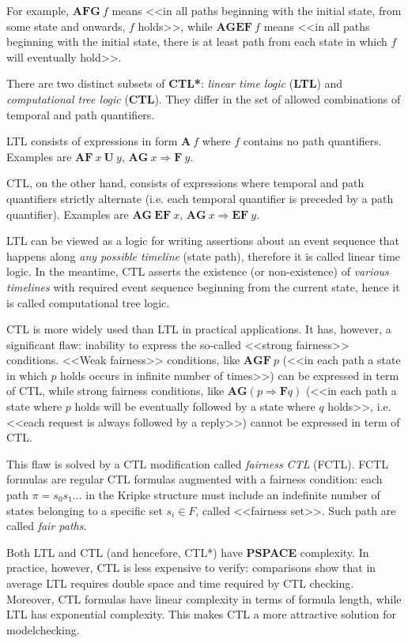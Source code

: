 \documentclass[a4paper,notitlepage,14pt]{article}
\begin{document}
For example, $\mathbf{AFG}~f$ means <<in all paths beginning with the initial state, from some state
and onwards, $f$ holds>>, while $\mathbf{AGEF}~f$ means <<in all paths beginning with the initial state,
there is at least path from each state in which $f$ will eventually hold>>.

There are two distinct subsets of \textbf{CTL*}: \emph{linear time logic} (\textbf{LTL}) and \emph{computational tree
  logic} (\textbf{CTL}). They differ in the set of allowed combinations of temporal and path
quantifiers.

LTL consists of expressions in form $\mathbf{A}~f$ where $f$ contains no path quantifiers. Examples are
$\mathbf{AF}~x~\mathbf{U}~y$, $\mathbf{AG}~x \Rightarrow \mathbf{F}~y$.

CTL, on the other hand, consists of expressions where temporal and path quantifiers
strictly alternate (i.e. each temporal quantifier is preceded by a path
quantifier). Examples are $\mathbf{AG}~\mathbf{EF}~x$, $\mathbf{AG}~x \Rightarrow \mathbf{EF}~y$.

LTL can be viewed as a logic for writing assertions about an event sequence that happens
along \emph{any possible timeline} (state path), therefore it is called linear time logic. In the
meantime, CTL asserts the existence (or non-existence) of \emph{various timelines} with required
event sequence beginning from the current state, hence it is called computational tree
logic.

CTL is more widely used than LTL in practical applications. It has, however, a significant
flaw: inability to express the so-called <<strong fairness>> conditions. <<Weak fairness>>
conditions, like $\mathbf{AGF}~p$ (<<in each path a state in which $p$ holds occurs in infinite number
of times>>) can be expressed in term of CTL, while strong fairness conditions, like $\mathbf{AG} (p \Rightarrow
\mathbf{F} q)$ (<<in each path a state where $p$ holds will be eventually followed by a
state where $q$ holds>>, i.e. <<each request is always followed by a reply>>) cannot be
expressed in term of CTL.

This flaw is solved by a CTL modification called \emph{fairness CTL} (FCTL). FCTL formulas
are regular CTL formulas augmented with a fairness condition: each path $\pi =
s_0s_1\ldots$ in the Kripke structure must include an indefinite number of states
belonging to a specific set $s_i \in F$, called <<fairness set>>. Such path are called
\emph{fair paths}.

Both LTL and CTL (and hencefore, CTL*) have \textbf{PSPACE} complexity. In practice, however, CTL
is less expensive to verify: comparisons show that in average LTL requires double space and
time required by CTL checking. Moreover, CTL formulas have linear complexity in terms of
formula length, while LTL has exponential complexity. This makes CTL a more
attractive solution for modelchecking.
\end{document}
